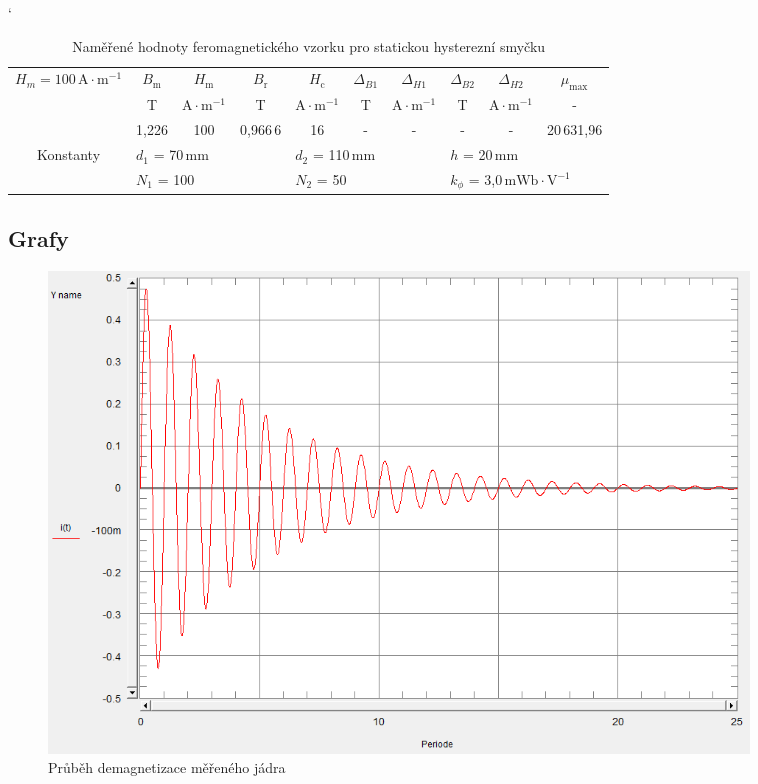 \documentclass[a4paper, czech]{article}
\begin{document}
\begin{table}[H]
    \catcode`
    \centering
    \caption{Naměřené hodnoty feromagnetického vzorku pro statickou hysterezní smyčku}
    \begin{tabular}{cccccccccc}
        \toprule
        \multirow{3}{*}{$H_m = 100\,\text{A} \cdot \text{m}^{-1}$} & $B_{\text{m}}$       & $H_{\text{m}}$       & $B_{\text{r}}$       & $H_{\text{c}}$        & $\Delta_{B1}$     & $\Delta_{H1}$       & $\Delta_{B2}$      & $\Delta_{H2}$        & $\mu_{\text{max}}$         \\
        \cmidrule(rl){2-2}
        \cmidrule(rl){3-3}
        \cmidrule(rl){4-4}
        \cmidrule(rl){5-5}
        \cmidrule(rl){6-6}
        \cmidrule(rl){7-7}
        \cmidrule(rl){8-8}
        \cmidrule(rl){9-9}
        \cmidrule(rl){10-10}
                                        & T        & $\text{A} \cdot \text{m}^{-1}$    & T        & $\text{A} \cdot \text{m}^{-1}$     & T       & $\text{A} \cdot \text{m}^{-1}$     & T        & $\text{A} \cdot \text{m}^{-1}$      & -            \\
        \cmidrule(rl){2-10}
                                        & 1,226    & 100      & 0,966\,6   & 16        & -       & -         & -        & -          & 20\,631,96     \\
        \cmidrule[0.8pt](rl){1-10}
        \multirow{2}{*}{Konstanty}      & \multicolumn{3}{l}{$d_1$ = 70\,mm} & \multicolumn{3}{l}{$d_2$ = 110\,mm} & \multicolumn{3}{l}{$h$ = 20\,mm}      \\
                                        & \multicolumn{3}{l}{$N_1$ = 100}   & \multicolumn{3}{l}{$N_2$ = 50}     & \multicolumn{3}{l}{$k_\phi$ = 3,0\,$\text{mWb} \cdot \text{V}^{-1}$} \\
        \bottomrule
    \end{tabular}
\end{table}

\subsection{Grafy}

\begin{figure}[H]
    \centering
    \includegraphics[width=0.9\textwidth]{demag.png}
    \caption{Průběh demagnetizace měřeného jádra}
\end{figure}
\end{document}
